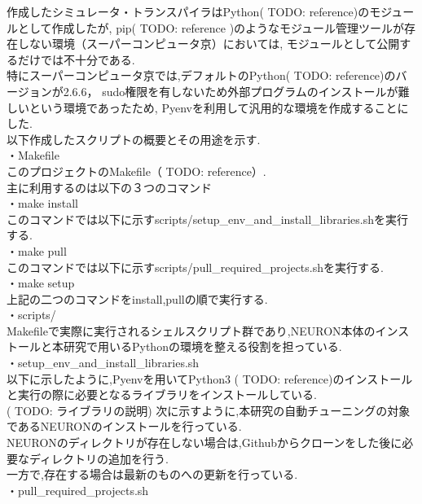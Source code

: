 作成したシミュレータ・トランスパイラはPython( TODO: reference)のモジュールとして作成したが,
pip( TODO: reference )のようなモジュール管理ツールが存在しない環境（スーパーコンピュータ京）においては,
モジュールとして公開するだけでは不十分である.\\
特にスーパーコンピュータ京では,デフォルトのPython( TODO: reference)のバージョンが2.6.6，
sudo権限を有しないため外部プログラムのインストールが難しいという環境であったため,
Pyenvを利用して汎用的な環境を作成することにした.\\
以下作成したスクリプトの概要とその用途を示す.\\
・Makefile\\
このプロジェクトのMakefile（ TODO: reference）.\\
主に利用するのは以下の３つのコマンド\\
\indent ・make install\\
\indent \indent このコマンドでは以下に示すscripts/setup\_env\_and\_install\_libraries.shを実行する.\\
\indent ・make pull\\
\indent \indent このコマンドでは以下に示すscripts/pull\_required\_projects.shを実行する.\\
\indent ・make setup\\
\indent \indent 上記の二つのコマンドをinstall,pullの順で実行する.\\
・scripts/\\
Makefileで実際に実行されるシェルスクリプト群であり,NEURON本体のインストールと本研究で用いるPythonの環境を整える役割を担っている.\\
\indent ・setup\_env\_and\_install\_libraries.sh\\
以下に示したように,Pyenvを用いてPython3 ( TODO: reference)のインストールと実行の際に必要となるライブラリをインストールしている.\\
( TODO: ライブラリの説明)
\indent {\footnotesize

}
次に示すように,本研究の自動チューニングの対象であるNEURONのインストールを行っている.\\
NEURONのディレクトリが存在しない場合は,Githubからクローンをした後に必要なディレクトリの追加を行う.\\
一方で,存在する場合は最新のものへの更新を行っている.\\
\indent ・pull\_required\_projects.sh\\
\indent {\footnotesize

}
